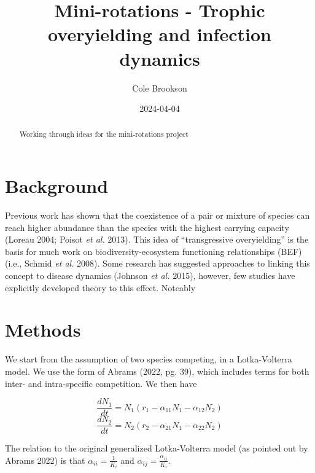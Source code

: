 \documentclass[
  letterpaper,
  DIV=11,
  numbers=noendperiod]{scrartcl}
\title{Mini-rotations - Trophic overyielding and infection dynamics}
\author{Cole Brookson}
\date{2024-04-04}
\renewcommand*\contentsname{Table of contents}
\newcommand\contentsname{Table of contents}
\begin{document}
\maketitle
\begin{abstract}
Working through ideas for the mini-rotations project
\end{abstract}

\renewcommand*\contentsname{Table of contents}
{
\hypersetup{linkcolor=}
\setcounter{tocdepth}{3}
\tableofcontents
}
\section{Background}

Previous work has shown that the coexistence of a pair or mixture of
species can reach higher abundance than the species with the highest
carrying capacity (Loreau 2004; Poisot \emph{et al.} 2013). This idea of
``transgressive overyielding'' is the basis for much work on
biodiversity-ecosystem functioning relationships (BEF) (i.e., Schmid
\emph{et al.} 2008). Some research has suggested approaches to linking
this concept to disease dynamics (Johnson \emph{et al.} 2015), however,
few studies have explicitly developed theory to this effect. Noteably

\section{Methods}

We start from the assumption of two species competing, in a
Lotka-Volterra model. We use the form of Abrams (2022, pg. 39), which
includes terms for both inter- and intra-specific competition. We then
have

\begin{equation}
  \label{eqn:simple-lv-1}
  \frac{dN_1}{dt} = N_1(r_1 - \alpha_{11}N_1 - \alpha_{12}N_2)
\end{equation} \begin{equation}
  \label{eqn:simple-lv-2}
  \frac{dN_2}{dt} = N_2(r_2 - \alpha_{21}N_1 - \alpha_{22}N_2)
\end{equation}

The relation to the original generalized Lotka-Volterra model (as
pointed out by Abrams 2022) is that \(\alpha_{ii} = \frac{1}{K_i}\) and
\(\alpha_{ij} = \frac{\alpha_{ij}}{K_i}\).
\end{document}
